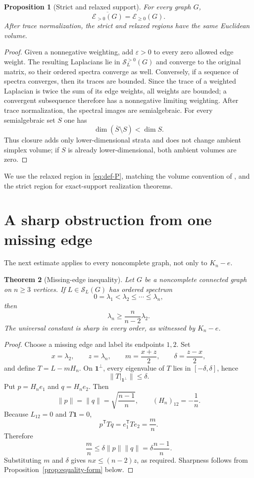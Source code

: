 \documentclass[11pt,reqno]{amsart}
\newtheorem{theorem}{Theorem}[section]
\newtheorem{proposition}[theorem]{Proposition}
\theoremstyle{definition}
\theoremstyle{remark}
\newcommand{\one}{\mathbf 1}
\newcommand{\SL}{\mathcal S_L}
\begin{document}
\begin{proposition}[Strict and relaxed support]\label{prop:support-closure}
For every graph $G$,
\[
  \overline{\mathcal E_{>0}(G)}=\mathcal E_{\ge0}(G).
\]
After trace normalization, the strict and relaxed regions have the same
Euclidean volume.
\end{proposition}

\begin{proof}
Given a nonnegative weighting, add $\varepsilon>0$ to every zero allowed edge
weight.  The resulting Laplacians lie in $\SL^{>0}(G)$ and converge to the
original matrix, so their ordered spectra converge as well.  Conversely, if a
sequence of spectra converges, then its traces are bounded.  Since the trace
of a weighted Laplacian is twice the sum of its edge weights, all weights are
bounded; a convergent subsequence therefore has a nonnegative limiting
weighting.  After trace normalization, the spectral images are semialgebraic.
For every semialgebraic set $S$ one has
\[
  \dim(\overline S\setminus S)<\dim S.
\]
Thus closure adds only lower-dimensional strata and does not change ambient
simplex volume; if $S$ is already lower-dimensional, both ambient volumes are
zero.
\end{proof}

We use the relaxed region in \eqref{eq:def-P}, matching the volume convention
of \cite{EJT2026}, and the strict region for exact-support realization
theorems.

\section{A sharp obstruction from one missing edge}\label{sec:obstruction}

The next estimate applies to every noncomplete graph, not only to $K_n-e$.

\begin{theorem}[Missing-edge inequality]\label{thm:missing-edge}
Let $G$ be a noncomplete connected graph on $n\ge3$ vertices.  If
$L\in\SL(G)$ has ordered spectrum
\[
  0=\lambda_1<\lambda_2\le\cdots\le\lambda_n,
\]
then
\begin{equation}\label{eq:missing-edge}
  \lambda_n\ge\frac{n}{n-2}\lambda_2.
\end{equation}
The universal constant is sharp in every order, as witnessed by $K_n-e$.
\end{theorem}

\begin{proof}
Choose a missing edge and label its endpoints $1,2$.  Set
\[
  x=\lambda_2,\qquad z=\lambda_n,\qquad
  m=\frac{x+z}{2},\qquad \delta=\frac{z-x}{2},
\]
and define $T=L-mH_n$.  On $\one^\perp$, every eigenvalue of $T$ lies in
$[-\delta,\delta]$, hence
\[
  \|T|_{\one^\perp}\|\le\delta.
\]
Put $p=H_ne_1$ and $q=H_ne_2$.  Then
\[
  \|p\|=\|q\|=\sqrt{\frac{n-1}{n}},
  \qquad (H_n)_{12}=-\frac1n.
\]
Because $L_{12}=0$ and $T\one=0$,
\[
  p^{\mathsf T}Tq=e_1^{\mathsf T}Te_2=\frac{m}{n}.
\]
Therefore
\[
  \frac{m}{n}
  \le \delta\|p\|\|q\|
  =\delta\frac{n-1}{n}.
\]
Substituting $m$ and $\delta$ gives $nx\le(n-2)z$, as required.
Sharpness follows from Proposition~\ref{prop:equality-form} below.
\end{proof}
\end{document}
